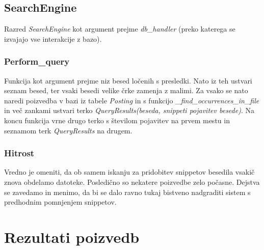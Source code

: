 \documentclass[runningheads]{llncs}
\begin{document}
\subsection{SearchEngine}
Razred \textit{SearchEngine} kot argument prejme \textit{db\_handler} (preko katerega se izvajajo vse interakcije z bazo).

\subsubsection{Perform\_query}
Funkcija kot argument prejme niz besed ločenih s presledki. Nato iz teh ustvari seznam besed, ter vsaki besedi velike črke zamenja z malimi. Za vsako se nato naredi poizvedba v bazi iz tabele \textit{Posting} in s funkcijo \textit{\_find\_occurrences\_in\_file} in več zankami ustvari terko \textit{QueryResults(beseda, snippeti pojavitev besede)}. Na koncu funkcija vrne drugo terko s številom pojavitev na prvem mestu in seznamom terk \textit{QueryResults} na drugem.

\subsubsection{Hitrost}
Vredno je omeniti, da ob samem iskanju za pridobitev snippetov besedila vsakič znova obdelamo datoteke. Posledično so nekatere poizvedbe zelo počasne. Dejstva se zavedamo in menimo, da bi se dalo ravno tukaj bistveno nadgraditi sistem s predhodnim pomnjenjem snippetov.

\section{Rezultati poizvedb}
\end{document}
